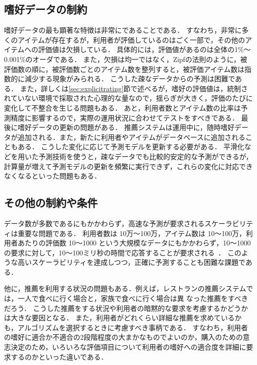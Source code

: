 \subsection{嗜好データの制約}

嗜好データの最も顕著な特徴は非常にであることである．
すなわち，非常に多くのアイテムが存在するが，利用者が評価しているのはごく一部で，その他のアイテムへの評価値は欠損している．
具体的には，評価値があるのは全体の1\%〜0.001\%のオーダである\cite{dmkd:01:01}．
また，欠損は均一ではなく，Zipfの法則\cite{j:0021}のように，被評価数の順に，被評価数ごとのアイテム数を整列すると，被評価アイテム数は指数的に減少する現象がみられる\cite{misc:007}．
こうした疎なデータからの予測は困難である．
また，詳しくは\ref{sec:explicitrating}節で述べるが，嗜好の評価値は，統制されていない環境で採取された心理的な量なので，揺らぎが大きく，評価のたびに変化して不整合を生じる問題もある．
あと，利用者数とアイテム数の比率は予測精度に影響する\cite{jacm:04:01}ので，実際の運用状況に合わせてテストをすべきである．
最後に嗜好データの更新の問題がある．
推薦システムは運用中に，随時嗜好データが追加される．また，新たに利用者やアイテムがデータベースに追加されることもある．
こうした変化に応じて予測モデルを更新する必要がある．
平滑化などを用いた予測技術を使うと，疎なデータでも比較的安定的な予測ができるが，計算量が増えて予測モデルの更新を頻繁に実行できず，これらの変化に対応できなくなるといった問題もある．

\subsection{その他の制約や条件}

データ数が多数であるにもかかわらず，高速な予測が要求されるスケーラビリティは重要な問題である．
利用者数は 10万〜100万，アイテム数は 10〜100万，利用者あたりの評価数 10〜1000 という大規模なデータにもかかわらず，10〜1000の要求に対して，10〜100ミリ秒の時間で応答することが要求される~\cite{dmkd:01:01,ieeem:03:01}．
このような高いスケーラビリティを達成しつつ，正確に予測することも困難な課題である．

他に，推薦を利用する状況の問題もある．例えば，レストランの推薦システムでは，一人で食べに行く場合と，家族で食べに行く場合は異
なった推薦をすべきだろう．
こうした推薦をする状況や利用者の暗黙的な要求を考慮するかどうかは大きな要因となる．
また，利用者がどれくらい詳細な推薦を求めているかも，アルゴリズムを選択するときに考慮すべき事柄である．
すなわち，利用者の嗜好に適合か不適合の2段階程度の大まかなものでよいのか，購入のための意志決定のため，いろいろな評価項目について利用者の嗜好への適合度を詳細に要求するのかといった違いである．

